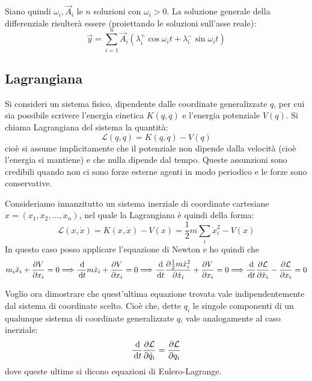 \documentclass[../main.tex]{subfiles}
\begin{document}
Siano quindi $\omega_i, \vec A_i$ le $n$ soluzioni con $\omega_i>0$.
La soluzione generale della differenziale risulterà essere (proiettando le soluzioni sull'asse reale):
\begin{equation}\label{opgl:Soluzioni}
	\vec y = \sum_{i=1}^n \vec A_i\left( \lambda^+_i\cos\omega_i t + \lambda^-_i\sin \omega_i t \right)
\end{equation}

\subsection{Lagrangiana}\label{lag}
Si consideri un sistema fisico, dipendente dalle coordinate generalizzate $q$, per cui sia possibile scrivere l'energia cinetica $K(q,\dot q)$ e l'energia potenziale $V(q)$.
Si chiama Lagrangiana del sistema la quantità:
\begin{equation}\label{lag:Definizione}
	\mathcal L(q,\dot q)=K(q,\dot q)-V(q)
\end{equation}
cioè si assume implicitamente che il potenziale non dipende dalla velocità (cioè l'energia si mantiene) e che nulla dipende dal tempo. Queste assunzioni sono credibili quando non ci sono forze esterne agenti in modo periodico e le forze sono conservative.

Consideriamo innanzitutto un sistema inerziale di coordinate cartesiane $x=(x_1,x_2,\dots,x_n)$, nel quale la Lagrangiana è quindi della forma:
\begin{equation*}
	\mathcal L(x,\dot x)=K(x,\dot x)-V(x)=\frac 12 m \sum_i\dot x_i^2-V(x)
\end{equation*}
In questo caso posso applicare l'equazione di Newton e ho quindi che 
\begin{equation*}
	m_i\ddot x_i+\frac{\partial V}{\partial x_i}=0 \Longrightarrow \frac{\,\mathrm{d}}{\,\mathrm{d} t} m\dot x_i +\frac{\partial V}{\partial x_i}=0 \Longrightarrow \frac{\,\mathrm{d}}{\,\mathrm{d} t} \frac{\partial \frac 12 m \dot x_i^2}{\partial \dot x_i} +\frac{\partial V}{\partial x_i}=0 \Longrightarrow \frac{\,\mathrm{d}}{\,\mathrm{d} t} \frac{\partial \mathcal L}{\partial \dot x_i} - \frac{\partial \mathcal L}{\partial x_i} =0
\end{equation*}

Voglio ora dimostrare che quest'ultima equazione trovata vale indipendentemente dal sistema di coordinate scelto. Cioè che, dette $q_i$ le singole componenti di un qualunque sistema di coordinate generalizzate $q$, vale analogamente al caso inerziale:
\begin{equation}\label{Lag:EqEuleroLagrange}
	\frac{\,\mathrm{d}}{\,\mathrm{d} t} \frac{\partial \mathcal L}{\partial \dot q_i} = \frac{\partial \mathcal L}{\partial q_i}
\end{equation}
dove queste ultime si dicono equazioni di Eulero-Lagrange.
\end{document}
